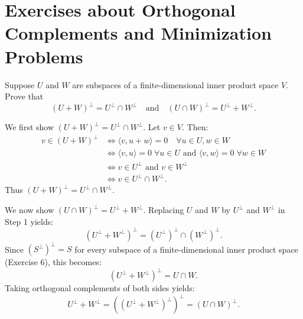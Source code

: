 \section*{Exercises about Orthogonal Complements and Minimization Problems}

\begin{xrcs}
  Suppose $U$ and $W$ are subspaces of a finite-dimensional inner product space $V$. Prove that
  \begin{equation}
    (U + W)^\perp = U^\perp \cap W^\perp \quad \text{and} \quad (U \cap W)^\perp = U^\perp + W^\perp.
  \end{equation}

\begin{xprf}
  \StepOne We first show $(U + W)^\perp = U^\perp \cap W^\perp$.
  Let $v \in V$. Then:
  \[
  \begin{aligned}
    v \in (U + W)^\perp &\iff \langle v, u+w \rangle = 0 \quad \forall u \in U, w \in W \\
    &\iff \langle v, u \rangle = 0 \;\forall u \in U \text{ and } \langle v, w \rangle = 0 \;\forall w \in W \\
    &\iff v \in U^\perp \text{ and } v \in W^\perp \\
    &\iff v \in U^\perp \cap W^\perp.
  \end{aligned}
  \]
  Thus $(U + W)^\perp = U^\perp \cap W^\perp$.

  \StepTwo We now show $(U \cap W)^\perp = U^\perp + W^\perp$.
  Replacing $U$ and $W$ by $U^\perp$ and $W^\perp$ in Step 1 yields:
  \[
    (U^\perp + W^\perp)^\perp = (U^\perp)^\perp \cap (W^\perp)^\perp.
  \]
  Since $(S^\perp)^\perp = S$ for every subspace of a finite-dimensional inner product space (Exercise 6), this becomes:
  \[
    (U^\perp + W^\perp)^\perp = U \cap W.
  \]
  Taking orthogonal complements of both sides yields:
  \[
    U^\perp + W^\perp = ((U^\perp + W^\perp)^\perp)^\perp = (U \cap W)^\perp.
  \]
\end{xprf}
\end{xrcs}

